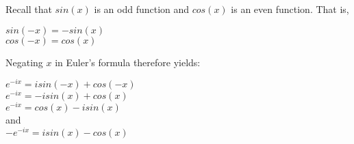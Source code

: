 Recall that $sin(x)$ is an odd function and $cos(x)$ is an even function. That is,
\begin{center}
    $sin(-x) = -sin(x)$ \\
    $cos(-x) = cos(x)$ \\
\end{center}

Negating $x$ in Euler's formula therefore yields:

\begin{center}
    $e^{-ix} = isin(-x) + cos(-x)$ \\
    $e^{-ix} = -isin(x) + cos(x)$ \\
    $e^{-ix} = cos(x) -isin(x) $ \\
                and \\ 
    $-e^{-ix} = isin(x) - cos(x)$
\end{center}


